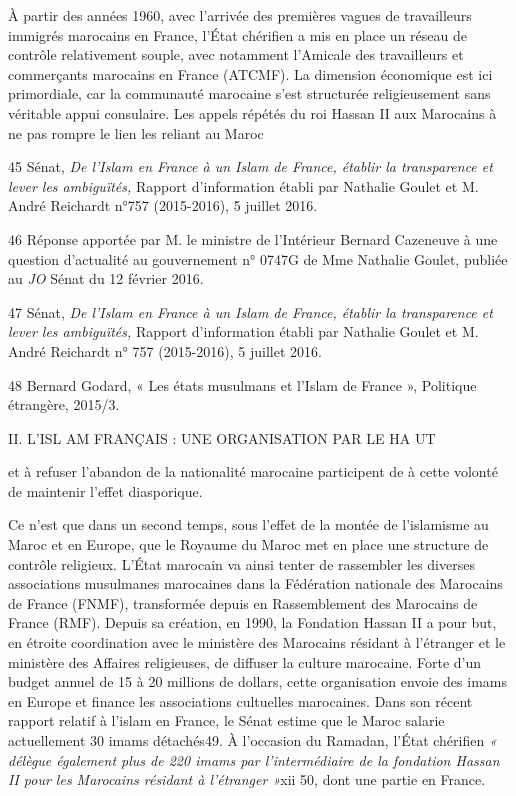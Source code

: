 À partir des années 1960, avec l'arrivée des premières vagues de
travailleurs immigrés marocains en France, l'État chérifien a mis en
place un réseau de contrôle relativement souple, avec notamment
l'Amicale des travailleurs et commerçants marocains en France (ATCMF).
La dimension économique est ici primordiale, car la communauté marocaine
s'est structurée religieusement sans véritable appui consulaire. Les
appels répétés du roi Hassan II aux Marocains à ne pas rompre le lien
les reliant au Maroc

45 Sénat, \emph{De l'Islam en France à un Islam de France, établir la
transparence et lever les ambiguïtés,} Rapport d'information établi par
Nathalie Goulet et M. André Reichardt n°757 (2015-2016), 5 juillet 2016.

46 Réponse apportée par M. le ministre de l'Intérieur Bernard Cazeneuve
à une question d'actualité au gouvernement n° 0747G de Mme Nathalie
Goulet, publiée au \emph{JO} Sénat du 12 février 2016.

47 Sénat, \emph{De l'Islam en France à un Islam de France, établir la
transparence et lever les ambiguïtés,} Rapport d'information établi par
Nathalie Goulet et M. André Reichardt n° 757 (2015-2016), 5 juillet
2016.

48 Bernard Godard, « Les états musulmans et l'Islam de France »,
Politique étrangère, 2015/3.

II. L'ISL AM FRANÇAIS : UNE ORGANISATION PAR LE HA UT

et à refuser l'abandon de la nationalité marocaine participent de à
cette volonté de maintenir l'effet diasporique.

Ce n'est que dans un second temps, sous l'effet de la montée de
l'islamisme au Maroc et en Europe, que le Royaume du Maroc met en place
une structure de contrôle religieux. L'État marocain va ainsi tenter de
rassembler les diverses associations musulmanes marocaines dans la
Fédération nationale des Marocains de France (FNMF), transformée depuis
en Rassemblement des Marocains de France (RMF). Depuis sa création, en
1990, la Fondation Hassan II a pour but, en étroite coordination avec le
ministère des Marocains résidant à l'étranger et le ministère des
Affaires religieuses, de diffuser la culture marocaine. Forte d'un
budget annuel de 15 à 20 millions de dollars, cette organisation envoie
des imams en Europe et finance les associations cultuelles marocaines.
Dans son récent rapport relatif à l'islam en France, le Sénat estime que
le Maroc salarie actuellement 30 imams détachés49. À l'occasion du
Ramadan, l'État chérifien \emph{« délègue également plus de 220 imams
par l'intermédiaire de la fondation Hassan II pour les Marocains
résidant à l'étranger »}xii 50, dont une partie en France.

